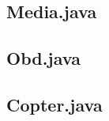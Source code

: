 \documentclass[hidelinks, 12pt, a4paper]{article}
\begin{document}


\subsection{Media.java}



\subsection{Obd.java}



\subsection{Copter.java}


\end{document}
